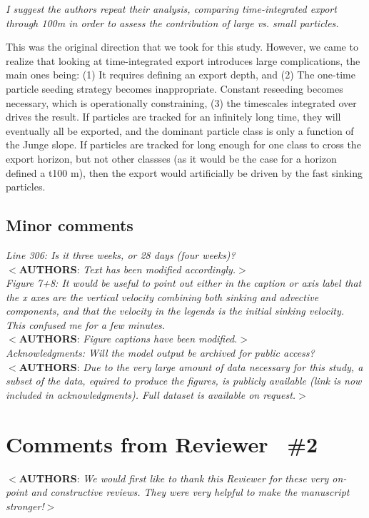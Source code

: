 \documentclass[12pt,letter]{article}
\newcommand{\rep}[1]{\color{blue}$<$\textbf{AUTHORS}: \textit{#1}$>$\color{black}\\}
\begin{document}
\textit{I suggest the authors repeat their analysis, comparing time-integrated export through 100m in order to assess the contribution of large vs. small particles.\\}

This was the original direction that we took for this study. However, we came to realize that looking at time-integrated export introduces large complications, the main ones being: (1) It requires defining an export depth, and (2) The one-time particle seeding strategy becomes inappropriate. Constant reseeding becomes necessary, which is operationally constraining, (3) the timescales integrated over drives the result. If particles are tracked for an infinitely long time, they will eventually all be exported, and the dominant particle class is only a function of the Junge slope. If particles are tracked for long enough for one class to cross the export horizon, but not other classses (as it would be the case for a horizon defined a t100 m), then the export would artificially be driven by the fast sinking particles.

\subsection*{Minor comments}
\textit{Line 306: Is it three weeks, or 28 days (four weeks)?}\\
\rep{Text has been modified accordingly.}
\textit{Figure 7+8: It would be useful to point out either in the caption or axis label that the x axes are the vertical velocity combining both sinking and advective components, and that the velocity in the legends is the initial sinking velocity. This confused me for a few minutes.}\\
\rep{Figure captions have been modified.}
\textit{Acknowledgments: Will the model output be archived for public access?}\\
\rep{Due to the very large amount of data necessary for this study, a subset of the data, equired to produce the figures, is publicly available (link is now included in acknowledgments). Full dataset is available on request.}

\section{Comments from Reviewer  \#2}
\rep{We would first like to thank this Reviewer for these very on-point and constructive reviews. They were very helpful to make the manuscript stronger!}
\end{document}
